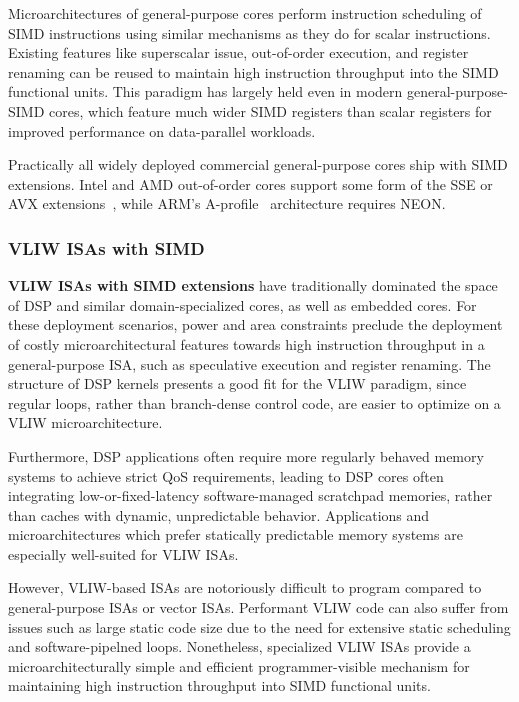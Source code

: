 Microarchitectures of general-purpose cores perform instruction scheduling of SIMD instructions using similar mechanisms as they do for scalar instructions.
Existing features like superscalar issue, out-of-order execution, and register renaming can be reused to maintain high instruction throughput into the SIMD functional units.
This paradigm has largely held even in modern general-purpose-SIMD cores, which feature much wider SIMD registers than scalar registers for improved performance on data-parallel workloads.

Practically all widely deployed commercial general-purpose cores ship with SIMD extensions.
Intel and AMD out-of-order cores support some form of the SSE or AVX extensions~\cite{intel_avx}, while ARM's A-profile~\cite{armv8a} architecture requires NEON.
 
\subsubsection{VLIW ISAs with SIMD}

\textbf{VLIW ISAs with SIMD extensions} have traditionally dominated the space of DSP and similar domain-specialized cores, as well as embedded cores.
For these deployment scenarios, power and area constraints preclude the deployment of costly microarchitectural features towards high instruction throughput in a general-purpose ISA, such as speculative execution and register renaming.
The structure of DSP kernels presents a good fit for the VLIW paradigm, since regular loops, rather than branch-dense control code, are easier to optimize on a VLIW microarchitecture.

Furthermore, DSP applications often require more regularly behaved memory systems to achieve strict QoS requirements, leading to DSP cores often integrating low-or-fixed-latency software-managed scratchpad memories, rather than caches with dynamic, unpredictable behavior.
Applications and microarchitectures which prefer statically predictable memory systems are especially well-suited for VLIW ISAs.

However, VLIW-based ISAs are notoriously difficult to program compared to general-purpose ISAs or vector ISAs.
Performant VLIW code can also suffer from issues such as large static code size due to the need for extensive static scheduling and software-pipelned loops.
Nonetheless, specialized VLIW ISAs provide a microarchitecturally simple and efficient programmer-visible mechanism for maintaining high instruction throughput into SIMD functional units.

